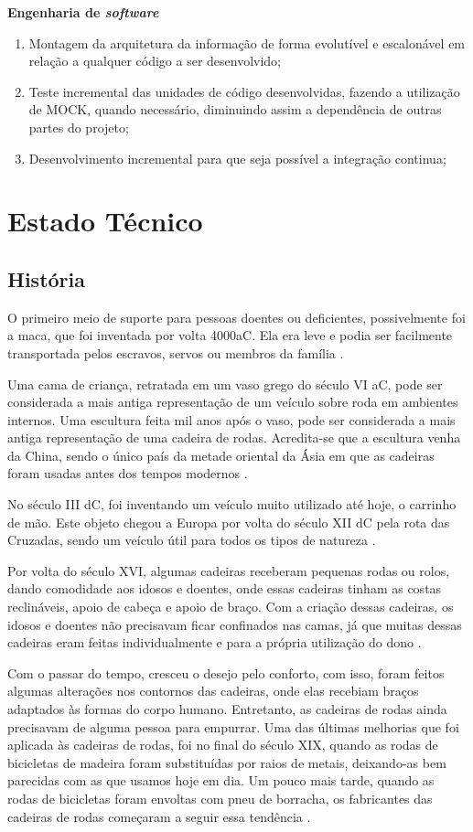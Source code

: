 \textbf{Engenharia de \textit{software}}
  \begin{enumerate}
    \item Montagem da arquitetura da informação de forma evolutível e escalonável em relação a qualquer código a ser desenvolvido;
    \item Teste incremental das unidades de código desenvolvidas, fazendo a utilização de MOCK, quando necessário, diminuindo assim a dependência de outras partes do projeto;
    \item Desenvolvimento incremental para que seja possível a integração continua;
  \end{enumerate}

\section{Estado Técnico}

\subsection{História}
O primeiro meio de suporte para pessoas doentes ou deficientes, possivelmente foi a maca, que foi inventada por volta 4000aC. Ela era leve e podia ser facilmente transportada pelos escravos, servos ou membros da família \cite{souza}.

Uma cama de criança, retratada em um vaso grego do século VI aC, pode ser considerada a mais antiga representação de um veículo sobre roda em ambientes internos. Uma escultura feita mil anos após o vaso, pode ser considerada a mais antiga representação de uma cadeira de rodas. Acredita-se que a escultura venha da China, sendo o único país da metade oriental da Ásia em que as cadeiras foram usadas antes dos tempos modernos \cite{souza}.

No século III dC, foi inventando um veículo muito utilizado até hoje, o carrinho de mão. Este objeto chegou a Europa por volta do século XII dC pela rota das Cruzadas, sendo um veículo útil para todos os tipos de natureza \cite{souza}.

Por volta do século XVI, algumas cadeiras receberam pequenas rodas ou rolos, dando comodidade aos idosos e doentes, onde essas cadeiras tinham as costas reclináveis, apoio de cabeça e apoio de braço. Com a criação dessas cadeiras, os idosos e doentes não precisavam ficar confinados nas camas, já que muitas dessas cadeiras eram feitas individualmente e para a própria utilização do dono \cite{souza}.

Com o passar do tempo, cresceu o desejo pelo conforto, com isso, foram feitos algumas alterações nos contornos das cadeiras, onde elas recebiam braços adaptados às formas do corpo humano. Entretanto, as cadeiras de rodas ainda precisavam de alguma pessoa para empurrar. Uma das últimas melhorias que foi aplicada às cadeiras de rodas, foi no final do século XIX, quando as rodas de bicicletas de madeira foram substituídas por raios de metais, deixando-as bem parecidas com as que usamos hoje em dia. Um pouco mais tarde, quando as rodas de bicicletas foram envoltas com pneu de borracha, os fabricantes das cadeiras de rodas começaram a seguir essa tendência \cite{souza}.

